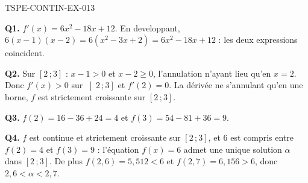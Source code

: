 \begin{corrige}{TSPE-CONTIN-EX-013}

\textbf{Q1.} $f'(x) = 6x^2 - 18x + 12$. En developpant, $6(x-1)(x-2) = 6(x^2 - 3x + 2) = 6x^2 - 18x + 12$ : les deux expressions coincident.

\textbf{Q2.} Sur $[2\,;3]$ : $x - 1 > 0$ et $x - 2 \geq 0$, l'annulation n'ayant lieu qu'en $x = 2$. Donc $f'(x) > 0$ sur $\left]2\,;3\right]$ et $f'(2) = 0$. La dérivée ne s'annulant qu'en une borne, $f$ est strictement croissante sur $[2\,;3]$.

\textbf{Q3.} $f(2) = 16 - 36 + 24 = 4$ et $f(3) = 54 - 81 + 36 = 9$.

\textbf{Q4.} $f$ est continue et strictement croissante sur $[2\,;3]$, et $6$ est compris entre $f(2) = 4$ et $f(3) = 9$ : l'équation $f(x) = 6$ admet une unique solution $\alpha$ dans $[2\,;3]$. De plus $f(2{,}6) = 5{,}512 < 6$ et $f(2{,}7) = 6{,}156 > 6$, donc $2{,}6 < \alpha < 2{,}7$.
\end{corrige}
